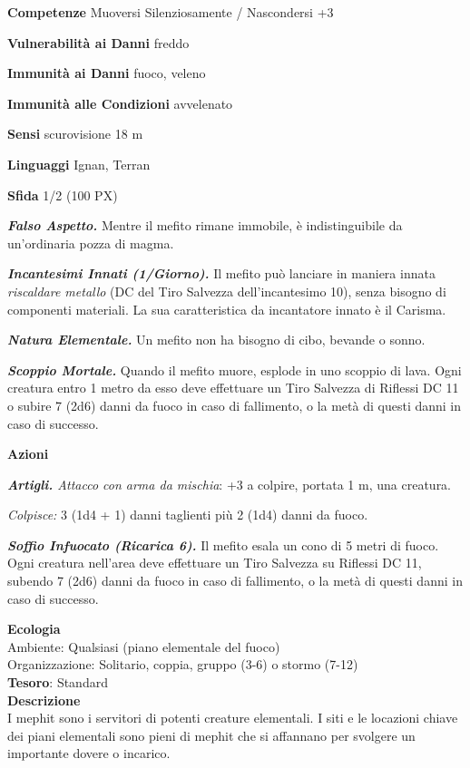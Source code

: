 \begin{multicols}{2}
	\textbf{Competenze} Muoversi Silenziosamente / Nascondersi +3

	\textbf{Vulnerabilità ai Danni} freddo

	\textbf{Immunità ai Danni} fuoco, veleno

	\textbf{Immunità alle Condizioni} avvelenato

	\textbf{Sensi} scurovisione 18 m

	\textbf{Linguaggi} Ignan, Terran

	\textbf{Sfida} 1/2 (100 PX)

	\textit{\textbf{Falso Aspetto.}} Mentre il mefito rimane immobile, è indistinguibile da un'ordinaria pozza di magma.

	\textit{\textbf{Incantesimi Innati (1/Giorno).}} Il mefito può lanciare in maniera innata \textit{riscaldare metallo} (DC del Tiro Salvezza dell'incantesimo 10), senza bisogno di componenti materiali. La sua caratteristica da incantatore innato è il Carisma.

	\textit{\textbf{Natura Elementale.}} Un mefito non ha bisogno di cibo, bevande o sonno.

	\textit{\textbf{Scoppio Mortale.}} Quando il mefito muore, esplode in uno scoppio di lava. Ogni creatura entro 1 metro da esso deve effettuare un Tiro Salvezza di Riflessi DC 11 o subire 7 (2d6) danni da fuoco in caso di fallimento, o la metà di questi danni in caso di successo.

	\textbf{Azioni}

	\textit{\textbf{Artigli.} Attacco con arma da mischia}: +3 a colpire, portata 1 m, una creatura.

	\textit{Colpisce:} 3 (1d4 + 1) danni taglienti più 2 (1d4) danni da fuoco.

	\textit{\textbf{Soffio Infuocato (Ricarica 6).}} Il mefito esala un cono di 5 metri di fuoco. Ogni creatura nell'area deve effettuare un Tiro Salvezza su Riflessi DC 11, subendo 7 (2d6) danni da fuoco in caso di fallimento, o la metà di questi danni in caso di successo.

	\textbf{Ecologia}\\
	Ambiente: Qualsiasi (piano elementale del fuoco)\\
	Organizzazione: Solitario, coppia, gruppo (3-6) o stormo (7-12)\\
	\textbf{Tesoro}: Standard\\
	\textbf{Descrizione}\\
	I mephit sono i servitori di potenti creature elementali. I siti e le locazioni chiave dei piani elementali sono pieni di mephit che si affannano per svolgere un importante dovere o incarico.


\end{multicols}
